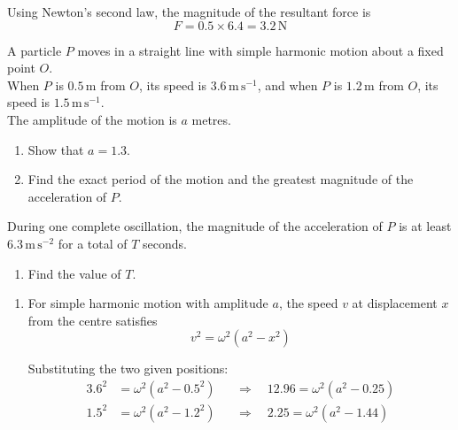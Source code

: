 \documentclass[leqno]{article}
\begin{document}
\begin{enumerate}[
  label=\textbf{\arabic*.},
  leftmargin=*,
  topsep=0pt,
  partopsep=0pt,
  parsep=0pt
]
\begin{djsSolution}
\begin{enumerate}[label=\textbf{(\alph*)}, start=1]
Using Newton's second law, the magnitude of the resultant force is
\[
F=0.5\times 6.4=3.2\,\mathrm{N}
\]
\end{enumerate}
\end{djsSolution}

\newpage

\questionitem

A particle $P$ moves in a straight line with simple harmonic motion about a fixed point $O$. \\
When $P$ is $0.5\,\mathrm{m}$ from $O$, its speed is $3.6\,\mathrm{m\,s^{-1}}$, and when $P$ is $1.2\,\mathrm{m}$ from $O$, its speed is $1.5\,\mathrm{m\,s^{-1}}$. \\
The amplitude of the motion is $a$ metres. \\
\begin{enumerate}[label=\textbf{(\alph*)}]
\item Show that $a=1.3$.  \\
\item Find the exact period of the motion and the greatest magnitude of the acceleration of $P$.  \\
\end{enumerate}
During one complete oscillation, the magnitude of the acceleration of $P$ is at least $6.3\,\mathrm{m\,s^{-2}}$ for a total of $T$ seconds. \\
\begin{enumerate}[resume, label=\textbf{(\alph*)}]
\item Find the value of $T$.  \\
\end{enumerate}

\vspace*{10pt}

\begin{djsSolution}
\begin{enumerate}[label=\textbf{(\alph*)}, start=1]
\item For simple harmonic motion with amplitude \(a\), the speed \(v\) at displacement \(x\) from the centre satisfies
\[
v^2=\omega^2\left(a^2-x^2\right)
\]

Substituting the two given positions:
\begin{align*}
3.6^2&=\omega^2\left(a^2-0.5^2\right) &&\Longrightarrow\quad 12.96=\omega^2\left(a^2-0.25\right)\\
1.5^2&=\omega^2\left(a^2-1.2^2\right) &&\Longrightarrow\quad 2.25=\omega^2\left(a^2-1.44\right)
\end{align*}


\end{enumerate}
\end{djsSolution}
\end{enumerate}
\end{document}
